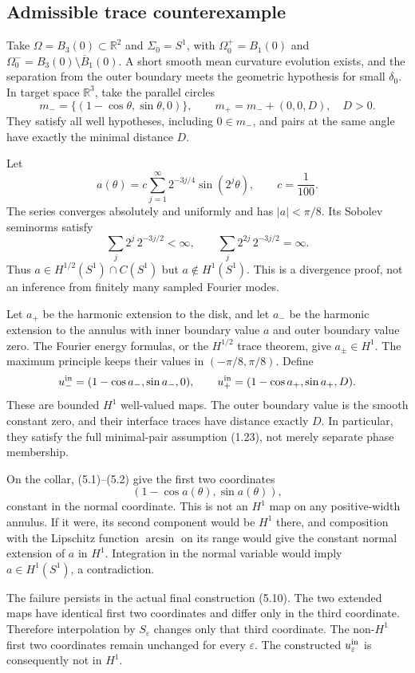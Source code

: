 \documentclass[10pt]{article}
\begin{document}
\subsection*{Admissible trace counterexample}
Take \(\Omega=B_3(0)\subset\mathbb R^2\) and \(\Sigma_0=S^1\), with \(\Omega_0^+=B_1(0)\) and \(\Omega_0^-=B_3(0)\setminus\overline B_1(0)\). A short smooth mean curvature evolution exists, and the separation from the outer boundary meets the geometric hypothesis for small \(\delta_0\). In target space \(\mathbb R^3\), take the parallel circles \[m_-=\{(1-\cos\theta,\sin\theta,0)\},\qquad
 m_+=m_-+(0,0,D),\quad D>0.\] They satisfy all well hypotheses, including \(0\in m_-\), and pairs at the same angle have exactly the minimal distance \(D\).\par
Let \[a(\theta)=c\sum_{j=1}^{\infty}2^{-3j/4}\sin(2^j\theta),
 \qquad c=\frac1{100}.\] The series converges absolutely and uniformly and has \(|a|<\pi/8\). Its Sobolev seminorms satisfy \[\sum_j 2^j\,2^{-3j/2}<\infty,\qquad
 \sum_j 2^{2j}\,2^{-3j/2}=\infty.\] Thus \(a\in H^{1/2}(S^1)\cap C(S^1)\) but \(a\notin H^1(S^1)\). This is a divergence proof, not an inference from finitely many sampled Fourier modes.\par
Let \(a_+\) be the harmonic extension to the disk, and let \(a_-\) be the harmonic extension to the annulus with inner boundary value \(a\) and outer boundary value zero. The Fourier energy formulas, or the \(H^{1/2}\) trace theorem, give \(a_\pm\in H^1\). The maximum principle keeps their values in \((-\pi/8,\pi/8)\). Define \[u_-^{\rm in}=(1-\cos a_-,\sin a_-,0),\qquad
 u_+^{\rm in}=(1-\cos a_+,\sin a_+,D).\] These are bounded \(H^1\) well-valued maps. The outer boundary value is the smooth constant zero, and their interface traces have distance exactly \(D\). In particular, they satisfy the full minimal-pair assumption (1.23), not merely separate phase membership.\par
On the collar, (5.1)–(5.2) give the first two coordinates \[(1-\cos a(\theta),\sin a(\theta)),\] constant in the normal coordinate. This is not an \(H^1\) map on any positive-width annulus. If it were, its second component would be \(H^1\) there, and composition with the Lipschitz function \(\arcsin\) on its range would give the constant normal extension of \(a\) in \(H^1\). Integration in the normal variable would imply \(a\in H^1(S^1)\), a contradiction.\par
The failure persists in the actual final construction (5.10). The two extended maps have identical first two coordinates and differ only in the third coordinate. Therefore interpolation by \(S_\varepsilon\) changes only that third coordinate. The non-\(H^1\) first two coordinates remain unchanged for every \(\varepsilon\). The constructed \(u_\varepsilon^{\rm in}\) is consequently not in \(H^1\).\par
\end{document}
